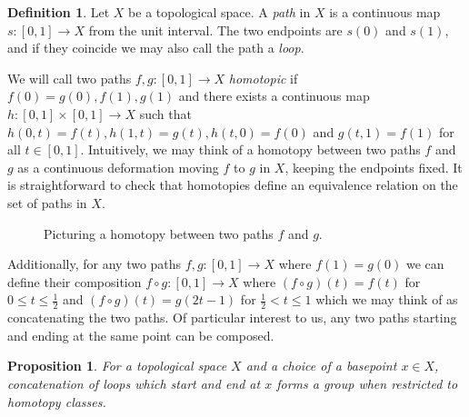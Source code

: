 \documentclass{article}
\theoremstyle{definition}
\newtheorem{definition}[theorem]{Definition}
\theoremstyle{remark}
\theoremstyle{plain}
\newtheorem{proposition}[theorem]{Proposition}
\begin{document}
\begin{definition}
	Let $X$ be a topological space. 
	A \textit{path} in $X$ is a continuous map $s: [0,1] \to X$ from the unit interval.
	The two endpoints are $s(0)$ and $s(1)$, and if they coincide we may also call the path a \textit{loop}.
\end{definition}

We will call two paths $f,g: [0,1] \to X$ \textit{homotopic} if $f(0) = g(0), f(1), g(1)$ and there exists a continuous map $h: [0,1] \times [0,1] \to X$ such that $h(0,t) = f(t), h(1,t) = g(t), h(t,0) = f(0)$ and $g(t,1) = f(1)$ for all $t \in [0,1]$.
Intuitively, we may think of a homotopy between two paths $f$ and $g$ as a continuous deformation moving $f$ to $g$ in $X$, keeping the endpoints fixed. 
It is straightforward to check that homotopies define an equivalence relation on the set of paths in $X$.\\

\begin{figure}[!h]
	\centering
{}
\caption{Picturing a homotopy between two paths $f$ and $g$.}
\end{figure}

\indent Additionally, for any two paths $f,g: [0,1] \to X$ where $f(1) = g(0)$ we can define their composition $f \circ g: [0,1] \to X$ where $(f \circ g )(t) = f(t)$ for $0 \leq t \leq \frac{1}{2}$ and $(f \circ g)(t) = g(2t - 1)$ for $ \frac{1}{2} < t \leq 1$ which we may think of as concatenating the two paths.
Of particular interest to us, any two paths starting and ending at the same point can be composed.

\begin{proposition}
	For a topological space $X$ and a choice of a basepoint $x \in X$, concatenation of loops which start and end at $x$ forms a group when restricted to homotopy classes.
\end{proposition}
\end{document}

